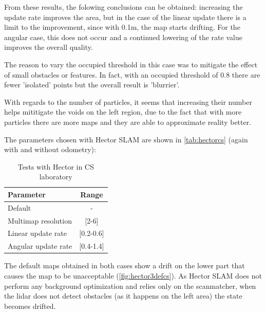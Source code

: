 From these results, the folowing conclusions can be obtained: increasing the update rate improves the area, but in the case of the linear update there is a limit to the improvement, since with 0.1m, the map starts drifting. For the angular case, this does not occur and a continued lowering of the rate value improves the overall quality.

The reason to vary the occupied threshold in this case was to mitigate the effect of small obstacles or features. In fact, with an occupied threshold of 0.8 there are fewer 'isolated' points but the overall result is 'blurrier'.

With regards to the number of particles, it seems that increasing their number helps mititigate the voids on the left region, due to the fact that with more particles there are more maps and they are able to approximate reality better.

The parameters chosen with Hector SLAM are shown in \autoref{tab:hectorcs} (again with and without odometry):
\begin{table}[h]
  \centering
  \begin{tabular}{lc}
  \hline
    \textbf{Parameter} & \textbf{Range} \\ \hline
    Default & - \\ \hline
    Multimap resolution & {[}2-6{]} \\ \hline
    Linear update rate & {[}0.2-0.6{]} \\ \hline
    Angular update rate & {[}0.4-1.4{]} \\ \hline
  \end{tabular}
  \caption{Tests with Hector in CS laboratory}
  \label{tab:hectorcs}
\end{table}

The default maps obtained in both cases show a drift on the lower part that causes the map to be unacceptable (\autoref{fig:hector3defcs}). As Hector SLAM does not perform any background optimization and relies only on the scanmatcher, when the lidar does not detect obstacles (as it happens on the left area) the state becomes drifted.

